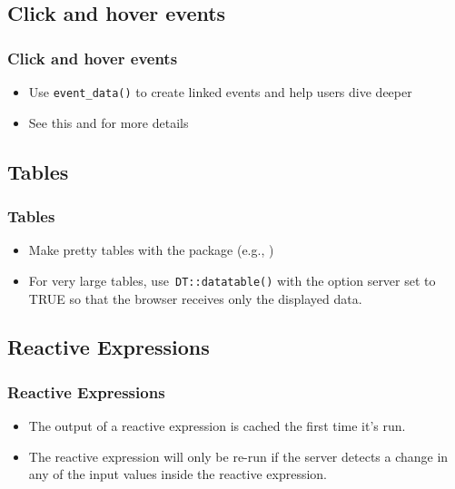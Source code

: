 \documentclass[
	11pt, %
]{beamer}
\begin{document}
\subsection{Click and hover events}

\begin{frame}
	\frametitle{Click and hover events}
	\begin{itemize}
	\item Use \texttt{event\_data()} to create linked events and help users dive deeper
	\item See this \href{https://plotly-r.com/linking-views-with-shiny.html\#shiny-plotly-inputs}{\color{blue}{documentation}} and \href{https://testing-apps.shinyapps.io/plotlyevents/}{\color{blue}{interactive example}} for more details
	\end{itemize}
\end{frame}

\subsection{Tables}
\begin{frame}
	\frametitle{Tables}
	
	\begin{itemize}
	\item Make pretty tables with the \href{https://glin.github.io/reactable/}{} package (e.g., \href{https://glin.github.io/reactable/articles/womens-world-cup/womens-world-cup.html}{\color{blue}{2019 Women's World Cup Predictions}})
	\item For very large tables, use\texttt{ DT::datatable()} with the option server set to TRUE so that the browser receives only the displayed data.
	\end{itemize}
	
\end{frame}

\subsection{Reactive Expressions}

\begin{frame}
	\frametitle{Reactive Expressions}
	
	\begin{itemize}
	\item The output of a reactive expression is cached the first time it's run.
	\item The reactive expression will only be re-run if the server detects a change in any of the input values inside the reactive expression.
	\end{itemize}
	
\end{frame}
\end{document}
